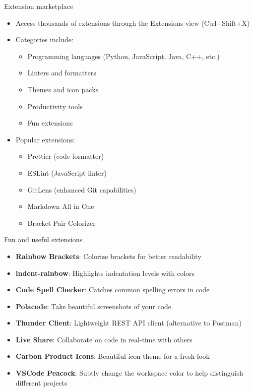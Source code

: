 \begin{frame}[fragile]{Extension marketplace}
	\begin{itemize}
		\item Access thousands of extensions through the Extensions view (Ctrl+Shift+X)
		\item Categories include:
		\begin{itemize}
			\item Programming languages (Python, JavaScript, Java, C++, etc.)
			\item Linters and formatters
			\item Themes and icon packs
			\item Productivity tools
			\item Fun extensions
		\end{itemize}
		\item Popular extensions:
		\begin{itemize}
			\item Prettier (code formatter)
			\item ESLint (JavaScript linter)
			\item GitLens (enhanced Git capabilities)
			\item Markdown All in One
			\item Bracket Pair Colorizer
		\end{itemize}
	\end{itemize}
\end{frame}

\begin{frame}[fragile]{Fun and useful extensions}
	\begin{itemize}
		\item \textbf{Rainbow Brackets}: Colorize brackets for better readability
		\item \textbf{ indent-rainbow}: Highlights indentation levels with colors
		\item \textbf{Code Spell Checker}: Catches common spelling errors in code
		\item \textbf{Polacode}: Take beautiful screenshots of your code
		\item \textbf{Thunder Client}: Lightweight REST API client (alternative to Postman)
		\item \textbf{Live Share}: Collaborate on code in real-time with others
		\item \textbf{Carbon Product Icons}: Beautiful icon theme for a fresh look
		\item \textbf{VSCode Peacock}: Subtly change the workspace color to help distinguish different projects
	\end{itemize}
\end{frame}

